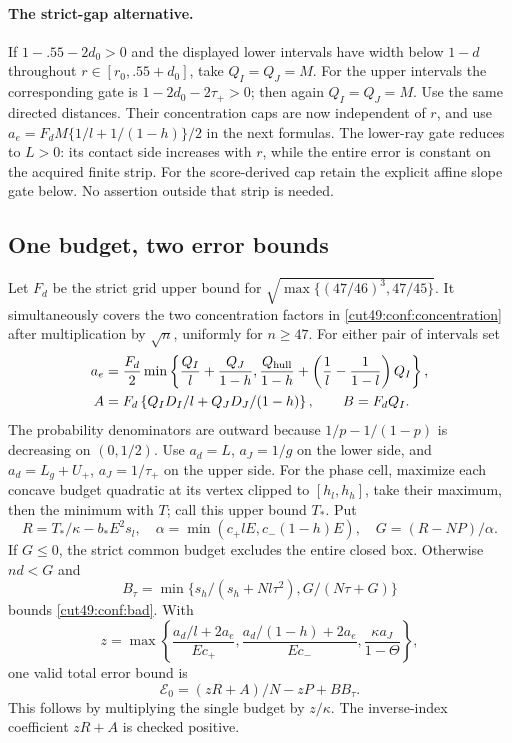 \documentclass[11pt,a4paper]{article}
\numberwithin{equation}{section}
\theoremstyle{definition}
\theoremstyle{remark}
\begin{document}
\paragraph{The strict-gap alternative.}
If $1-.55-2d_0>0$ and the displayed lower intervals have width below
$1-d$ throughout $r\in[r_0,.55+d_0]$, take $Q_I=Q_J=M$.
For the upper intervals the corresponding gate is
$1-2d_0-2\tau_+>0$; then again $Q_I=Q_J=M$.
Use the same directed distances. Their concentration caps are now
independent of $r$, and use
$a_e=F_dM\{1/l+1/(1-h)\}/2$ in the next formulas.
The lower-ray gate reduces to $L>0$: its contact side increases with
$r$, while the entire error is constant on the acquired finite strip.
For the score-derived cap retain the explicit affine slope gate below.
No assertion outside that strip is needed.

\subsection{One budget, two error bounds}
Let $F_d$ be the strict grid upper bound for
$\sqrt{\max\{(47/46)^3,47/45\}}$. It simultaneously covers the two
concentration factors in \eqref{cut49:conf:concentration} after multiplication by
$\sqrt n$, uniformly for $n\ge47$. For either pair of intervals set
\begin{align*}
 a_e&=\frac{F_d}{2}\min\left\{\frac{Q_I}l+\frac{Q_J}{1-h},
 \frac{Q_{\rm hull}}{1-h}+\left(\frac1l-\frac1{1-l}\right)Q_I\right\},\\
 A&=F_d\left\{Q_ID_I/l+Q_JD_J/(1-h)\right\},\qquad B=F_dQ_I.
\end{align*}
The probability denominators are outward because $1/p-1/(1-p)$ is
decreasing on $(0,1/2)$.
Use $a_d=L$, $a_J=1/g$ on the lower side, and
$a_d=L_g+U_+$, $a_J=1/\tau_+$ on the upper side.
For the phase cell, maximize each concave budget quadratic at its
vertex clipped to $[h_l,h_h]$, take their maximum, then the minimum
with $T$; call this upper bound $T_*$. Put
\[
 R=T_*/\kappa-b_*E^2s_l,
 \quad\alpha=\min(c_+lE,c_-(1-h)E),\quad G=(R-NP)/\alpha.
\]
If $G\le0$, the strict common budget excludes the entire closed box.
Otherwise $nd<G$ and
\[
 B_\tau=\min\{s_h/(s_h+Nl\tau^2),G/(N\tau+G)\}
\]
bounds \eqref{cut49:conf:bad}. With
\[
 z=\max\left\{\frac{a_d/l+2a_e}{Ec_+},
 \frac{a_d/(1-h)+2a_e}{Ec_-},\frac{\kappa a_J}{1-\Theta}\right\},
\]
one valid total error bound is
\begin{equation}\label{cut49:conf:oldbound}
 \mathcal E_0=(zR+A)/N-zP+B B_\tau.
\end{equation}
This follows by multiplying the single budget by $z/\kappa$.
The inverse-index coefficient $zR+A$ is checked positive.
\end{document}
